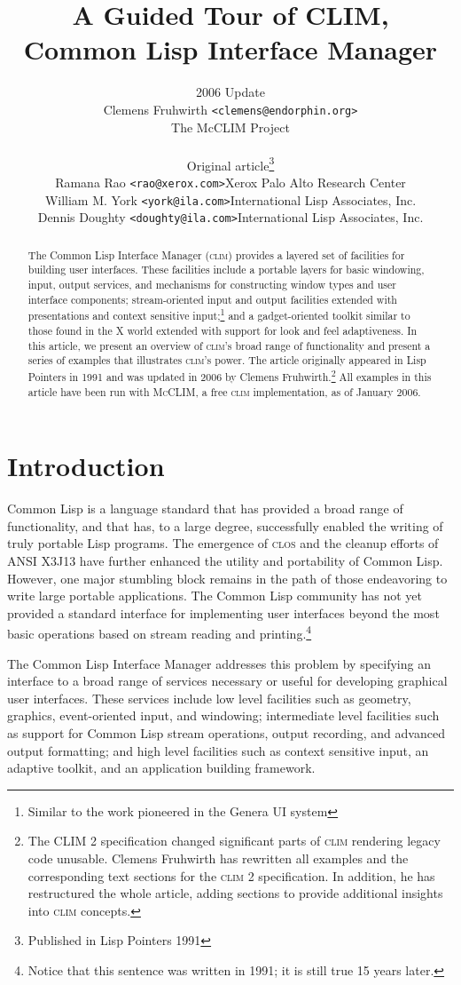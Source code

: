 \documentclass[twocolumn,a4paper]{article}
\title{\Huge A Guided Tour of CLIM, \\ Common Lisp Interface Manager}
\author{
2006 Update \\ 
Clemens Fruhwirth \texttt{<clemens@endorphin.org>} \\ The McCLIM Project 
\bigskip \\
\begin{tabular}{ll}
\multicolumn{2}{c}{Original article\footnote{Published in Lisp Pointers 1991}} \\ 
Ramana Rao \texttt{<rao@xerox.com>} &  Xerox Palo Alto Research Center \\
William M. York \texttt{<york@ila.com>} & International Lisp Associates, Inc. \\
Dennis Doughty \texttt{<doughty@ila.com>} &  International Lisp Associates, Inc. 
\end{tabular}
}
\newcommand {\CLIM}{\textsc{clim}}
\newcommand {\CLOS}{\textsc{clos}}
\newcommand {\mcclim}{\textsc{McCLIM}}
\begin{document}
\maketitle
\begin{abstract}
\noindent The Common Lisp Interface Manager (\CLIM{}) provides a
layered set of facilities for building user interfaces. These
facilities include a portable layers for basic windowing, input,
output services, and mechanisms for constructing window types and user
interface components; stream-oriented input and output facilities
extended with presentations and context sensitive
input;\footnote{Similar to the work pioneered in the Genera UI system}
and a gadget-oriented toolkit similar to those found in the X world
extended with support for look and feel adaptiveness. In this article,
we present an overview of \CLIM{}'s broad range of functionality and
present a series of examples that illustrates \CLIM{}'s power. The
article originally appeared in Lisp Pointers in 1991 and was updated
in 2006 by Clemens Fruhwirth.\footnote{The CLIM 2 specification
  changed significant parts of \CLIM{} rendering legacy code
  unusable. Clemens Fruhwirth has rewritten all examples and the 
  corresponding text sections for the \CLIM{} 2 specification. In
  addition, he has restructured the whole article, adding sections
  to provide additional insights into \CLIM{} concepts.} All examples
in this article have been run with \mcclim{}\cite{mcclim}, a free
\CLIM{} implementation, as of January 2006.
\end{abstract}

\section*{Introduction}
Common Lisp is a language standard that has provided a broad range of
functionality, and that has, to a large degree, successfully enabled
the writing of truly portable Lisp programs. The emergence of \CLOS{} and
the cleanup efforts of ANSI X3J13 have further enhanced the utility
and portability of Common Lisp. However, one major stumbling block
remains in the path of those endeavoring to write large portable
applications. The Common Lisp community has not yet provided a
standard interface for implementing user interfaces beyond the most
basic operations based on stream reading and printing.\footnote{Notice
  that this sentence was written in 1991; it is still
  true 15 years later.}

The Common Lisp Interface Manager addresses this problem by specifying
an interface to a broad range of services necessary or useful for
developing graphical user interfaces. These services include low level
facilities such as geometry, graphics, event-oriented input, and
windowing; intermediate level facilities such as support for Common Lisp
stream operations, output recording, and advanced output formatting;
and high level facilities such as context sensitive input, an adaptive
toolkit, and an application building framework.
\end{document}
